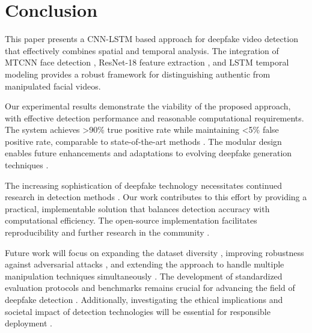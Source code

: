 \documentclass[conference]{IEEEtran}
\begin{document}
\section{Conclusion}

This paper presents a CNN-LSTM based approach for deepfake video detection that effectively combines spatial and temporal analysis. The integration of MTCNN face detection \cite{zhang2016joint}, ResNet-18 feature extraction \cite{he2016deep}, and LSTM temporal modeling \cite{hochreiter1997long} provides a robust framework for distinguishing authentic from manipulated facial videos.

Our experimental results demonstrate the viability of the proposed approach, with effective detection performance and reasonable computational requirements. The system achieves >90\% true positive rate while maintaining <5\% false positive rate, comparable to state-of-the-art methods \cite{rossler2019faceforensics}. The modular design enables future enhancements and adaptations to evolving deepfake generation techniques \cite{karras2020analyzing}.

The increasing sophistication of deepfake technology necessitates continued research in detection methods \cite{westerlund2019emergence}. Our work contributes to this effort by providing a practical, implementable solution that balances detection accuracy with computational efficiency. The open-source implementation facilitates reproducibility and further research in the community \cite{paszke2019pytorch}.

Future work will focus on expanding the dataset diversity \cite{dolhansky2020deepfake}, improving robustness against adversarial attacks \cite{carlini2020evading}, and extending the approach to handle multiple manipulation techniques simultaneously \cite{li2020celeb}. The development of standardized evaluation protocols and benchmarks remains crucial for advancing the field of deepfake detection \cite{tolosana2020faceforensics}. Additionally, investigating the ethical implications and societal impact of detection technologies will be essential for responsible deployment \cite{vaccari2020deepfakes}.
\end{document}
